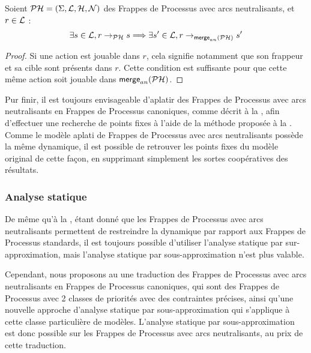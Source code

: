 \begin{theorem}
  Soient $\mathcal{PH} = (\Sigma, \mathcal{L}, \mathcal{H}, \mathcal{N})$ des Frappes de Processus avec arcs neutralisants,
  et $r \in \mathcal{L}$ :
  \[\exists s \in \mathcal{L}, r \rightarrow_{\mathcal{PH}} s \Longrightarrow
    \exists s' \in \mathcal{L}, r \rightarrow_{\mathsf{merge}_{an}(\mathcal{PH})} s'\]
\end{theorem}

\begin{proof}
  Si une action est jouable dans $r$, cela signifie notamment
  que son frappeur et sa cible sont présents dans $r$.
  Cette condition est suffisante pour que cette même action soit jouable dans $\mathsf{merge}_{an}(\mathcal{PH})$.
\end{proof}


Pur finir, il est toujours envisageable d'aplatir des Frappes de Processus avec
arcs neutralisants en Frappes de Processus canoniques,
comme décrit à la ,
afin d'effectuer une recherche de points fixes à l'aide de la méthode
proposée à la .
Comme le modèle aplati de Frappes de Processus avec arcs neutralisants possède la même dynamique,
il est possible de retrouver les points fixes du modèle original de cette façon,
en supprimant simplement les sortes coopératives des résultats.

\subsubsection{Analyse statique}

De même qu'à la ,
étant donné que les Frappes de Processus avec arcs neutralisants permettent de restreindre
la dynamique par rapport aux Frappes de Processus standards, il est toujours possible
d'utiliser l'analyse statique par sur-approximation,
mais l'analyse statique par sous-approximation n'est plus valable.

Cependant, nous proposons au 
une traduction des Frappes de Processus avec arcs neutralisants en Frappes de Processus canoniques,
qui sont des Frappes de Processus avec 2 classes de priorités avec des contraintes précises,
ainsi qu'une nouvelle approche d'analyse statique par sous-approximation
qui s'applique à cette classe particulière de modèles.
L'analyse statique par sous-approximation est donc possible sur les Frappes de Processus
avec arcs neutralisants, au prix de cette traduction.

